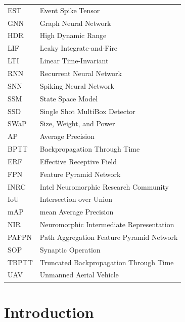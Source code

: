 \documentclass[11pt, a4paper]{report}
\newcounter{frontmatterpages}
\begin{document}
\begin{tabular}{ll}
EST & Event Spike Tensor \\
GNN & Graph Neural Network \\
HDR & High Dynamic Range \\
LIF & Leaky Integrate-and-Fire \\
LTI & Linear Time-Invariant \\
RNN & Recurrent Neural Network \\
SNN & Spiking Neural Network \\
SSM & State Space Model \\
SSD & Single Shot MultiBox Detector \\
SWaP & Size, Weight, and Power \\
AP & Average Precision \\
BPTT & Backpropagation Through Time \\
ERF & Effective Receptive Field \\
FPN & Feature Pyramid Network \\
INRC & Intel Neuromorphic Research Community \\
IoU & Intersection over Union \\
mAP & mean Average Precision \\
NIR & Neuromorphic Intermediate Representation \\
PAFPN & Path Aggregation Feature Pyramid Network \\
SOP & Synaptic Operation \\
TBPTT & Truncated Backpropagation Through Time \\
UAV & Unmanned Aerial Vehicle \\
\end{tabular}


\clearpage
\setcounter{frontmatterpages}{\value{page}}

\chapter{Introduction}
\label{ch:intro}
\end{document}
